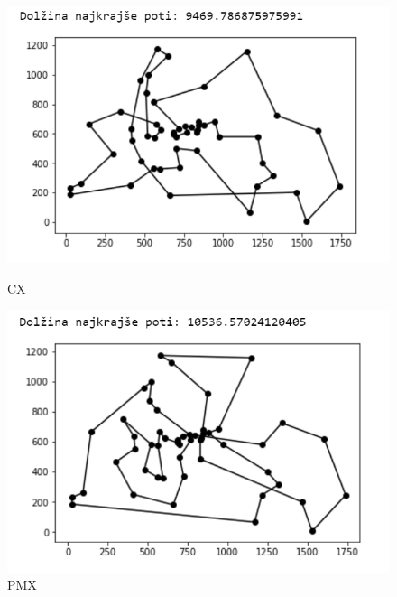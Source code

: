\documentclass[12pt,a4paper]{amsart}
\theoremstyle{definition} %
\theoremstyle{plain} %
\begin{document}
\begin{figure}[h!]
\begin{minipage}[t]{0.48\textwidth}
\includegraphics[width=\linewidth,keepaspectratio=true]{CX-primer}
\caption{CX}
\label{CX}
\end{minipage}
\hspace*{\fill} %
\begin{minipage}[t]{0.48\textwidth}
\includegraphics[width=\linewidth,keepaspectratio=true]{PMX-primer}
\caption{PMX}
\label{PMX}
\end{minipage}
\hspace*{\fill} %
\begin{minipage}[t]{0.48\textwidth}

\end{minipage}
\end{figure}
\end{document}

